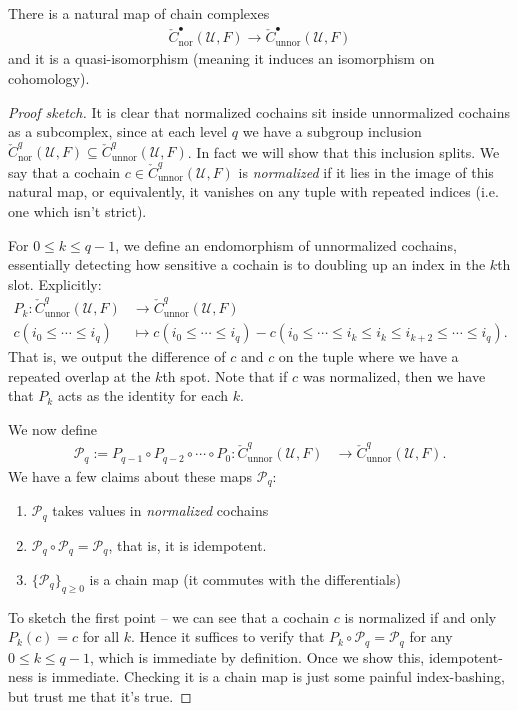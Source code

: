 \documentclass[11pt]{book}
\begin{document}
\begin{theorem} There is a natural map of chain complexes
\begin{align*}
    \check{C}^\bullet_\text{nor}(\mathcal{U},F) \to \check{C}^\bullet_\text{unnor}(\mathcal{U},F)
\end{align*}
and it is a quasi-isomorphism (meaning it induces an isomorphism on cohomology).
\end{theorem}
\begin{proof}[Proof sketch]
It is clear that normalized cochains sit inside unnormalized cochains as a subcomplex, since at each level $q$ we have a subgroup inclusion $\check{C}^q_\text{nor}(\mathcal{U},F) \subseteq \check{C}^q_\text{unnor}(\mathcal{U},F)$. In fact we will show that this inclusion splits. We say that a cochain $c\in \check{C}^q_\text{unnor}(\mathcal{U},F)$ is \emph{normalized} if it lies in the image of this natural map, or equivalently, it vanishes on any tuple with repeated indices (i.e. one which isn't strict).

For $0\le k\le q-1$, we define an endomorphism of unnormalized cochains, essentially detecting how sensitive a cochain is to doubling up an index in the $k$th slot. Explicitly:
\begin{align*}
    P_k \colon \check{C}^q_\text{unnor}(\mathcal{U},F) &\to \check{C}^q_\text{unnor}(\mathcal{U},F) \\
    c(i_0\le \cdots \le i_q) &\mapsto c(i_0\le \cdots \le i_q) - c(i_0 \le \cdots \le i_k \le i_k \le i_{k+2}\le \cdots \le i_q).
\end{align*}
That is, we output the difference of $c$ and $c$ on the tuple where we have a repeated overlap at the $k$th spot. Note that if $c$ was normalized, then we have that $P_k$ acts as the identity for each $k$.

We now define
\begin{align*}
    \mathcal{P}_q := P_{q-1}\circ P_{q-2} \circ \cdots \circ P_0 \colon \check{C}^q_\text{unnor}(\mathcal{U},F) &\to \check{C}^q_\text{unnor}(\mathcal{U},F).
\end{align*}
%
We have a few claims about these maps $\mathcal{P}_q$:
\begin{enumerate}
    \item $\mathcal{P}_q$ takes values in \emph{normalized} cochains
    \item $\mathcal{P}_q \circ \mathcal{P}_q = \mathcal{P}_q$, that is, it is idempotent.
    \item $\{\mathcal{P}_q\}_{q\ge0}$ is a chain map (it commutes with the differentials)
\end{enumerate}
To sketch the first point -- we can see that a cochain $c$ is normalized if and only $P_k(c)=c$ for all $k$. Hence it suffices to verify that $P_k\circ \mathcal{P}_q = \mathcal{P}_q$ for any $0\le k\le q-1$, which is immediate by definition. Once we show this, idempotent-ness is immediate. Checking it is a chain map is just some painful index-bashing, but trust me that it's true.


\end{proof}
\end{document}
